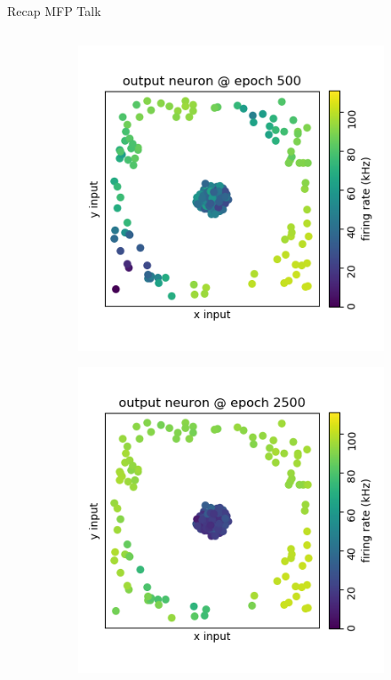 \documentclass[12pt, aspectratio=169]{beamer}
\begin{document}
\begin{frame}{Recap MFP Talk}
\begin{columns}[t]
\begin{column}{0.5\textwidth}
\begin{figure}
\begin{subfigure}{0.3\textwidth}
				\includegraphics[scale=0.20]{mfp/learning_process/output_neuron_500.png}
				\label{cubesetup}
			\end{subfigure}	
			\begin{subfigure}{0.3\textwidth}
				\centering
				\includegraphics[scale=0.20]{mfp/learning_process/output_neuron_2500.png}
			\end{subfigure}
		    \end{figure}
		    
		\begin{figure}
		     	\vspace{-.7cm}
		     	\scalebox{0.8}{}
		\end{figure}
		
		\vspace{-1.5cm}
	\end{column}
	\end{columns}
\end{frame}
\end{document}
